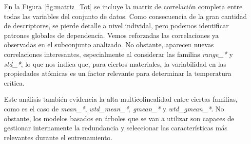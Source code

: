 \documentclass[titlepage, 11pt]{book}
\begin{document}
En la Figura \ref{fig:matriz_Tot} se incluye la matriz de correlación completa entre todas las variables del conjunto de datos. Como consecuencia de la gran cantidad de descriptores, se pierde detalle a nivel individal, pero podemos identificar patrones globales de dependencia. Vemos reforzadas las correlaciones ya observadas en el subconjunto analizado. No obstante, aparecen nuevas correlaciones interesantes, especialmente al considerar las familias \textit{range\_*} y \textit{std\_*}, lo que nos indica que, para ciertos materiales, la variabilidad en las propiedades atómicas es un factor relevante para determinar la temperatura crítica.

Este análisis también evidencia la alta multicolinealidad entre ciertas familias, como es el caso de \textit{mean\_*}, \textit{wtd\_mean\_*}, \textit{gmean\_*} y \textit{wtd\_gmean\_*}. No obstante, los modelos basados en árboles que se van a utilizar son capaces de gestionar internamente la redundancia y seleccionar las características más relevantes durante el entrenamiento.
\end{document}
